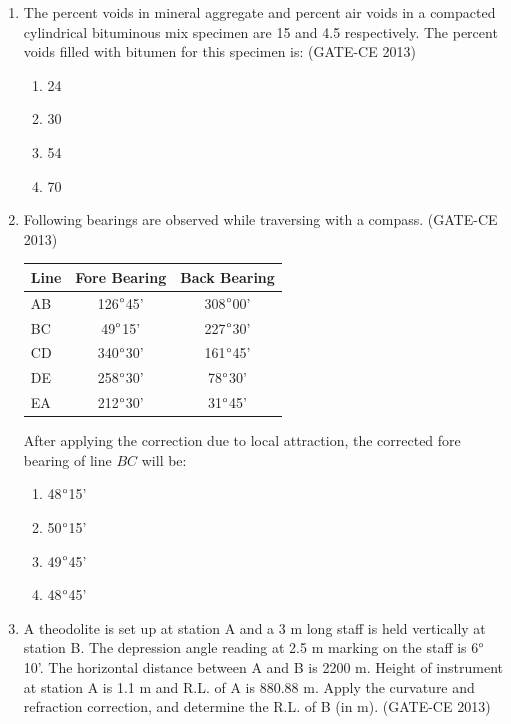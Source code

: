 \documentclass[journal,12pt,onecolumn]{article}
\theoremstyle{remark}
\begin{document}
\begin{enumerate}
    \item The percent voids in mineral aggregate  and percent air voids  in a compacted cylindrical bituminous mix specimen are 15 and 4.5 respectively. The percent voids filled with bitumen  for this specimen is: (GATE-CE 2013)
    \begin{multicols}{4}
    \begin{enumerate}
        \item 24 
        \item 30 
        \item 54 
        \item 70
    \end{enumerate}
    \end{multicols}
    
    \item Following bearings are observed while traversing with a compass. (GATE-CE 2013)
    
    \begin{table}[H]
    \centering
    \begin{tabular}{|l|c|c|}
    \hline
    Line & Fore Bearing & Back Bearing \\
    \hline
    AB & 126$\degree$45' & 308$\degree$00' \\
    BC & 49$\degree$15' & 227$\degree$30' \\
    CD & 340$\degree$30' & 161$\degree$45' \\
    DE & 258$\degree$30' & 78$\degree$30' \\
    EA & 212$\degree$30' & 31$\degree$45' \\
    \hline
    \end{tabular}
    \end{table}
    
    After applying the correction due to local attraction, the corrected fore bearing of line $BC$ will be:
    \begin{multicols}{4}
    \begin{enumerate}
        \item 48$\degree$15' 
        \item 50$\degree$15' 
        \item 49$\degree$45' 
        \item 48$\degree$45'
    \end{enumerate}
    \end{multicols}
    
    \item A theodolite is set up at station A and a 3 m long staff is held vertically at station B. The depression angle reading at 2.5 m marking on the staff is 6$\degree$10'. The horizontal distance between A and B is 2200 m. Height of instrument at station A is 1.1 m and R.L. of A is 880.88 m. Apply the curvature and refraction correction, and determine the R.L. of B (in m). \underline{\hspace{3cm}} (GATE-CE 2013)


\end{enumerate}
\end{document}
